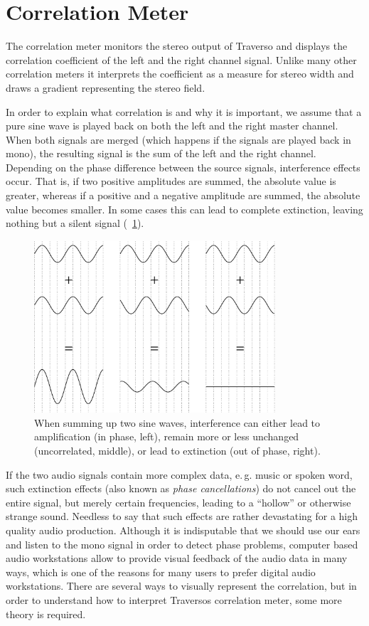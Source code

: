 \section{Correlation Meter}
The correlation meter monitors the stereo output of Traverso and displays the correlation coefficient of the left and the right channel signal. Unlike many other correlation meters it interprets the coefficient as a measure for stereo width and draws a gradient representing the stereo field.

In order to explain what correlation is and why it is important, we assume that a pure sine wave is played back on both the left and the right master channel. When both signals are merged (which happens if the signals are played back in mono), the resulting signal is the sum of the left and the right channel. Depending on the phase difference between the source signals, interference effects occur. That is, if two positive amplitudes are summed, the absolute value is greater, whereas if a positive and a negative amplitude are summed, the absolute value becomes smaller. In some cases this can lead to complete extinction, leaving nothing but a silent signal (\FigB\ \ref{fig_interference}).

\begin{figure}
	\centering\includegraphics[width=0.8\textwidth]{../images/sine01}
	\caption{When summing up two sine waves, interference can either lead to amplification (in phase, left), remain more or less unchanged (uncorrelated, middle), or lead to extinction (out of phase, right).}
	\label{fig_interference}
\end{figure}

If the two audio signals contain more complex data, e.\,g. music or spoken word, such extinction effects (also known as \emph{phase cancellations}) do not cancel out the entire signal, but merely certain frequencies, leading to a ``hollow'' or otherwise strange sound. Needless to say that such effects are rather devastating for a high quality audio production. Although it is indisputable that we should use our ears and listen to the mono signal in order to detect phase problems, computer based audio workstations allow to provide visual feedback of the audio data in many ways, which is one of the reasons for many users to prefer digital audio workstations. There are several ways to visually represent the correlation, but in order to understand how to interpret Traversos correlation meter, some more theory is required.


